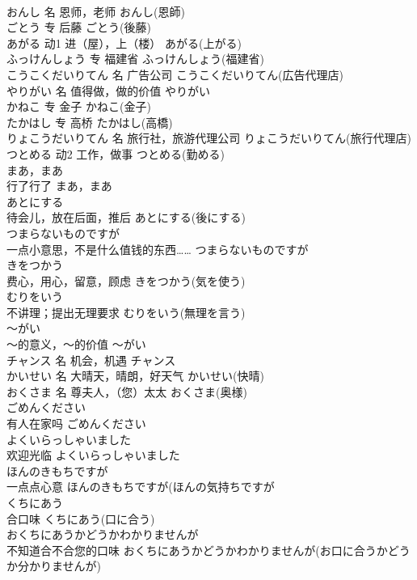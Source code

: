 \documentclass[8pt]{extreport}
\begin{document}
\begin{CJK}{UTF8}{min}
\\	おんし	名	恩师，老师	おんし(恩師)	
\\	ごとう	专	后藤	ごとう(後藤)	
\\	あがる	动1	进（屋），上（楼）	あがる(上がる)	
\\	ふっけんしょう	专	福建省	ふっけんしょう(福建省)	
\\	こうこくだいりてん	名	广告公司	こうこくだいりてん(広告代理店)	
\\	やりがい	名	值得做，做的价值	やりがい	
\\	かねこ	专	金子	かねこ(金子)	
\\	たかはし	专	高桥	たかはし(高橋)	
\\	りょこうだいりてん	名	旅行社，旅游代理公司	りょこうだいりてん(旅行代理店)	
\\	つとめる	动2	工作，做事	つとめる(勤める)	
\\	まあ，まあ	
\\	行了行了	まあ，まあ	
\\	あとにする	
\\	待会儿，放在后面，推后	あとにする(後にする)	
\\	つまらないものですが	
\\	一点小意思，不是什么值钱的东西……	つまらないものですが	
\\	きをつかう	
\\	费心，用心，留意，顾虑	きをつかう(気を使う)	
\\	むりをいう	
\\	不讲理；提出无理要求	むりをいう(無理を言う)	
\\	～がい	
\\	～的意义，～的价值	～がい	
\\	チャンス	名	机会，机遇	チャンス	
\\	かいせい	名	大晴天，晴朗，好天气	かいせい(快晴)	
\\	おくさま	名	尊夫人，（您）太太	おくさま(奥様)	
\\	ごめんください	
\\	有人在家吗	ごめんください	
\\	よくいらっしゃいました	
\\	欢迎光临	よくいらっしゃいました	
\\	ほんのきもちですが	
\\	一点点心意	ほんのきもちですが(ほんの気持ちですが 
\\	くちにあう	
\\	合口味	くちにあう(口に合う)	
\\	おくちにあうかどうかわかりませんが	
\\	不知道合不合您的口味	おくちにあうかどうかわかりませんが(お口に合うかどうか分かりませんが)	

\end{CJK}
\end{document}
